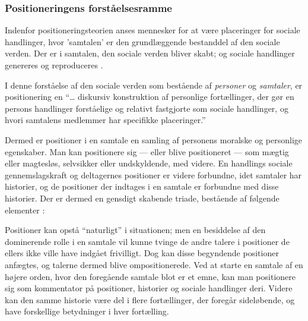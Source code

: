
\subsubsection{Positioneringens forståelsesramme}

Indenfor positioneringsteorien anses mennesker for at være 
placeringer for sociale handlinger, hvor 'samtalen' er den 
grundlæggende bestanddel af den sociale verden. Der er i samtalen,
den sociale verden bliver skabt; og sociale handlinger genereres 
og reproduceres \autocite[s. 
15]{harrePositioningTheoryMoral1999}.

I denne forståelse af den sociale verden som bestående af 
\emph{personer} og \emph{samtaler}, er positionering en “\ldots 
diskursiv konstruktion af personlige fortællinger, der gør en 
persons handlinger forståelige og relativt fastgjorte som sociale 
handlinger, og hvori samtalens medlemmer har specifikke 
placeringer.” \autocite[s. 16]{harrePositioningTheoryMoral1999}

Dermed er positioner i en samtale en samling af personens moralske
og personlige egenskaber. Man kan positionere sig — eller blive 
positioneret — som mægtig eller magtesløs, selvsikker eller 
undskyldende, med videre. En handlings sociale gennemslagskraft og
deltagernes positioner er videre forbundne, idet samtaler har 
historier, og de positioner der indtages i en samtale er forbundne
med disse historier. Der er dermed en gensdigt skabende triade, 
bestående af følgende elementer \autocite[s.  
17-18]{harrePositioningTheoryMoral1999}:



Positioner kan opstå “naturligt” i situationen; men en besiddelse 
af den dominerende rolle i en samtale vil kunne tvinge de andre 
talere i positioner de ellers ikke ville have indgået frivilligt. 
Dog kan disse begyndende positioner anfægtes, og talerne dermed 
blive ompositionerede. Ved at starte en samtale af en højere 
orden, hvor den foregående samtale blot er et emne, kan man 
positionere sig som kommentator på positioner, historier og 
sociale handlinger deri. Videre kan den samme historie være del i
flere fortællinger, der foregår sideløbende, og have forskellige 
betydninger i hver fortælling.


